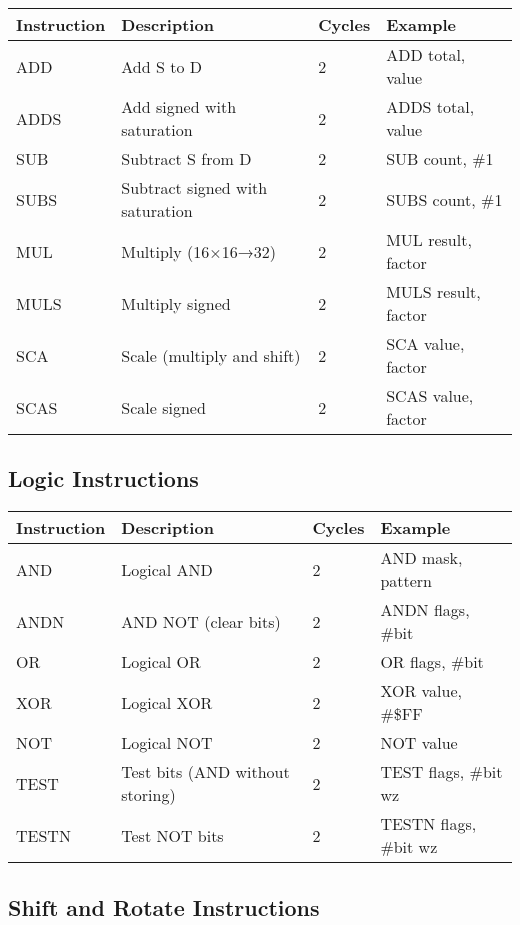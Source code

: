 \documentclass[11pt]{book}
\begin{document}
\begin{longtable}[]{@{}llll@{}}
\toprule
Instruction & Description & Cycles & Example \\
\midrule
\endhead
ADD & Add S to D & 2 & ADD total, value \\
ADDS & Add signed with saturation & 2 & ADDS total, value \\
SUB & Subtract S from D & 2 & SUB count, \#1 \\
SUBS & Subtract signed with saturation & 2 & SUBS count, \#1 \\
MUL & Multiply (16×16→32) & 2 & MUL result, factor \\
MULS & Multiply signed & 2 & MULS result, factor \\
SCA & Scale (multiply and shift) & 2 & SCA value, factor \\
SCAS & Scale signed & 2 & SCAS value, factor \\
\bottomrule
\end{longtable}

\hypertarget{logic-instructions}{%
\subsection{Logic Instructions}\label{logic-instructions}}

\begin{longtable}[]{@{}llll@{}}
\toprule
Instruction & Description & Cycles & Example \\
\midrule
\endhead
AND & Logical AND & 2 & AND mask, pattern \\
ANDN & AND NOT (clear bits) & 2 & ANDN flags, \#bit \\
OR & Logical OR & 2 & OR flags, \#bit \\
XOR & Logical XOR & 2 & XOR value, \#\$FF \\
NOT & Logical NOT & 2 & NOT value \\
TEST & Test bits (AND without storing) & 2 & TEST flags, \#bit wz \\
TESTN & Test NOT bits & 2 & TESTN flags, \#bit wz \\
\bottomrule
\end{longtable}

\hypertarget{shift-and-rotate-instructions}{%
\subsection{Shift and Rotate
Instructions}\label{shift-and-rotate-instructions}}
\end{document}
